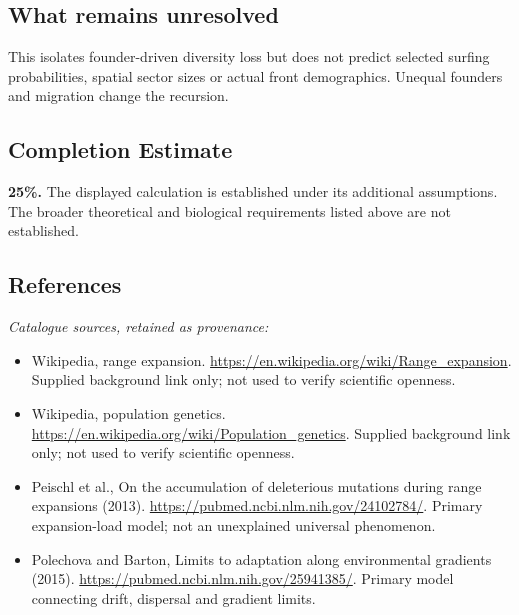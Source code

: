 \documentclass[11pt]{article}
\begin{document}
\subsection{What remains unresolved}
This isolates founder-driven diversity loss but does not predict selected surfing probabilities, spatial sector sizes or actual front demographics. Unequal founders and migration change the recursion.
\subsection{Completion Estimate}
\textbf{25\%.} The displayed calculation is established under its additional assumptions. The broader theoretical and biological requirements listed above are not established.
\subsection{References}
\noindent\emph{Catalogue sources, retained as provenance:}
\begin{itemize}
\item Wikipedia, range expansion. \url{https://en.wikipedia.org/wiki/Range_expansion}. Supplied background link only; not used to verify scientific openness.
\item Wikipedia, population genetics. \url{https://en.wikipedia.org/wiki/Population_genetics}. Supplied background link only; not used to verify scientific openness.
\item Peischl et al., On the accumulation of deleterious mutations during range expansions (2013). \url{https://pubmed.ncbi.nlm.nih.gov/24102784/}. Primary expansion-load model; not an unexplained universal phenomenon.
\item Polechova and Barton, Limits to adaptation along environmental gradients (2015). \url{https://pubmed.ncbi.nlm.nih.gov/25941385/}. Primary model connecting drift, dispersal and gradient limits.
\end{itemize}
\end{document}
